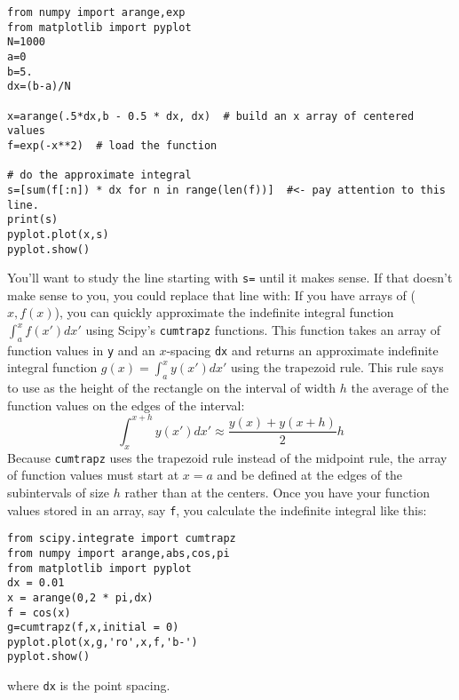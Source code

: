 \begin{Verbatim}
from numpy import arange,exp
from matplotlib import pyplot
N=1000
a=0
b=5.
dx=(b-a)/N

x=arange(.5*dx,b - 0.5 * dx, dx)  # build an x array of centered values
f=exp(-x**2)  # load the function

# do the approximate integral
s=[sum(f[:n]) * dx for n in range(len(f))]  #<- pay attention to this line.
print(s)
pyplot.plot(x,s)
pyplot.show()
\end{Verbatim}
You'll want to study the line starting with \verb!s=! until it makes
sense.  If that doesn't make sense to you, you could replace that line
with:
If you have arrays of
($x,f(x)$), you can quickly approximate the indefinite integral function
$\int_a^x f(x') dx'$ using Scipy's {\tt cumtrapz} functions.
 This function takes an array of function
values in {\tt y} and an $x$-spacing {\tt dx} and returns an approximate
indefinite integral function $g(x)=\int_a^x y(x') dx'$ using the trapezoid
rule. This rule says to use as the height of the rectangle on the interval of
width $h$ the average of the function values on the edges of the interval:
\begin{equation}
\int_x^{x+h} y(x') dx' \approx \frac{y(x)+y(x+h) }{ 2} h
\end{equation}
Because \texttt{cumtrapz} uses the trapezoid rule instead of the midpoint
rule, the array of function values must start at $x=a$ and be defined at the
edges of the subintervals of size $h$ rather than at the centers.  Once you
have your function values stored in an array, say \texttt{f}, you calculate
the indefinite integral like this:
\begin{Verbatim}
from scipy.integrate import cumtrapz
from numpy import arange,abs,cos,pi
from matplotlib import pyplot
dx = 0.01
x = arange(0,2 * pi,dx)
f = cos(x)
g=cumtrapz(f,x,initial = 0)
pyplot.plot(x,g,'ro',x,f,'b-')
pyplot.show()
\end{Verbatim}
where \texttt{dx} is the point spacing.

